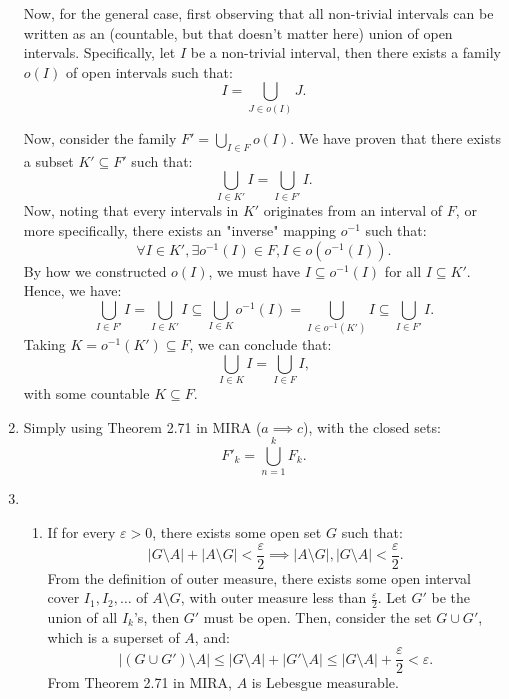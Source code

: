 \begin{enumerate}[label=\textbf{2D.\arabic*}]
  Now, for the general case, first observing that all non-trivial intervals can
  be written as an (countable, but that doesn't matter here) union of open
  intervals. Specifically, let \( I \) be a non-trivial interval, then there
  exists a family \( o(I) \) of open intervals such that:
  \[
    I = \bigcup_{J \in o(I)} J
  .\] 

  Now, consider the family \( F' = \bigcup_{I \in F} o(I) \). We have proven
  that there exists a subset \( K' \subseteq F' \) such that:
  \[
    \bigcup_{I \in K'} I = \bigcup_{I \in F'} I
  .\] 
  Now, noting that every intervals in \( K' \) originates from an interval of \(
  F\), or more specifically, there exists an "inverse" mapping \( o^{-1} \) such
  that:
  \[
    \forall I \in K', \exists o^{-1}(I) \in F, I \in o(o^{-1}(I))
  .\] 
  By how we constructed \( o(I) \), we must have \( I \subseteq o^{-1}(I) \) for
  all \( I \subseteq K' \).
  Hence, we have:
  \[
    \bigcup_{I \in F'} I =
    \bigcup_{I \in K'} I \subseteq \bigcup_{I \in K} o^{-1}(I) = \bigcup_{I \in
    o^{-1}(K')} I
    \subseteq
    \bigcup_{I \in F'} I
  .\] 
  Taking \( K = o^{-1}(K') \subseteq F \), we can conclude that:
  \[
    \bigcup_{I \in K} I =
    \bigcup_{I \in F} I
  ,\] with some countable \( K \subseteq F \).
\item 
  \label{2D5}
  Simply using Theorem 2.71 in MIRA (\( a \implies c \)), with the closed sets:
  \[
    F'_{k} = \bigcup_{n = 1}^{k} F_{k}
  .\] 
\item 
  \begin{enumerate}[label=(\alph*)]
    \item 
  If for every \( \varepsilon > 0 \),
  there exists some open set \( G \) such that:
  \[
    |G \setminus A| + |A \setminus G| < \frac{\varepsilon}{2} \implies |A
    \setminus G|, |G \setminus A| < \frac{\varepsilon}{2}
  .\] From the definition of outer measure, there exists some open interval
  cover \( I_{1}, I_{2}, \ldots  \) of \( A \setminus G \), with outer measure
  less than \( \frac{\varepsilon}{2} \). Let \( G' \) be the union of all \(
  I_{k} \)'s, then \( G' \) must be open. Then, consider the set \( G \cup G'
  \), which is a superset of \( A \), and:
  \[
    |(G \cup G') \setminus A| \le |G \setminus A| + |G' \setminus A| \le |G
    \setminus A| + \frac{\varepsilon}{2} < \varepsilon
  .\] 
  From Theorem 2.71 in MIRA, \( A \) is Lebesgue measurable.


\end{enumerate}
\end{enumerate}
